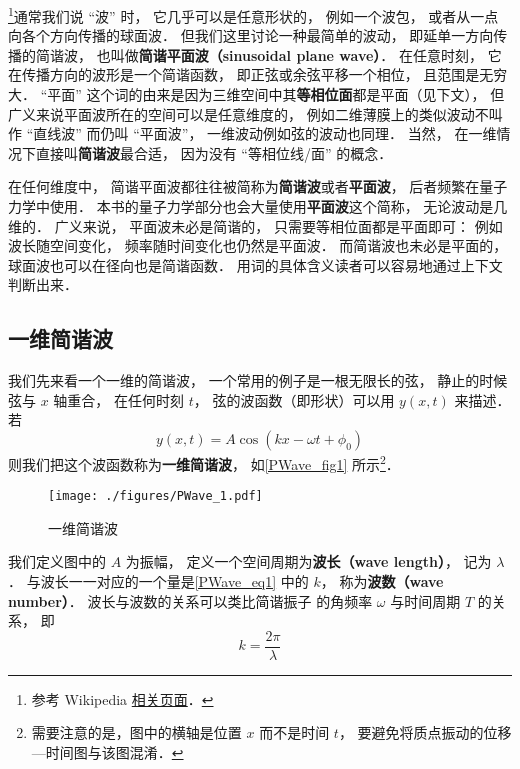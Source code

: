 

\footnote{参考 Wikipedia \href{https://en.wikipedia.org/wiki/Plane_wave#Sinusoidal_plane_wave}{相关页面}．}通常我们说 “波” 时， 它几乎可以是任意形状的， 例如一个波包， 或者从一点向各个方向传播的球面波． 但我们这里讨论一种最简单的波动， 即延单一方向传播的简谐波， 也叫做\textbf{简谐平面波（sinusoidal plane wave）}． 在任意时刻， 它在传播方向的波形是一个简谐函数， 即正弦或余弦平移一个相位， 且范围是无穷大． “平面” 这个词的由来是因为三维空间中其\textbf{等相位面}都是平面（见下文）， 但广义来说平面波所在的空间可以是任意维度的， 例如二维薄膜上的类似波动不叫作 “直线波” 而仍叫 “平面波”， 一维波动例如弦的波动也同理． 当然， 在一维情况下直接叫\textbf{简谐波}最合适， 因为没有 “等相位线/面” 的概念．

在任何维度中， 简谐平面波都往往被简称为\textbf{简谐波}或者\textbf{平面波}， 后者频繁在量子力学中使用． 本书的量子力学部分也会大量使用\textbf{平面波}这个简称， 无论波动是几维的． 广义来说， 平面波未必是简谐的， 只需要等相位面都是平面即可： 例如波长随空间变化， 频率随时间变化也仍然是平面波． 而简谐波也未必是平面的， 球面波也可以在径向也是简谐函数． 用词的具体含义读者可以容易地通过上下文判断出来．

\subsection{一维简谐波}
我们先来看一个一维的简谐波， 一个常用的例子是一根无限长的弦， 静止的时候弦与 $x$ 轴重合， 在任何时刻 $t$， 弦的波函数（即形状）可以用 $y(x, t)$ 来描述． 若
\begin{equation}\label{PWave_eq1}
y(x, t) = A\cos(k x - \omega t + \phi_0)
\end{equation}
则我们把这个波函数称为\textbf{一维简谐波}， 如\autoref{PWave_fig1} 所示\footnote{需要注意的是，图中的横轴是位置 $x$ 而不是时间 $t$， 要避免将质点振动的位移—时间图与该图混淆．}．

\begin{figure}[ht]
\centering
\texttt{[image: ./figures/PWave\_1.pdf]}
\caption{一维简谐波} \label{PWave_fig1}
\end{figure}

我们定义图中的 $A$ 为振幅， 定义一个空间周期为\textbf{波长（wave length）}， 记为 $\lambda$． 与波长一一对应的一个量是\autoref{PWave_eq1} 中的 $k$， 称为\textbf{波数（wave number）}． 波长与波数的关系可以类比简谐振子 的角频率 $\omega$ 与时间周期 $T$ 的关系， 即
\begin{equation}\label{PWave_eq2}
k = \frac{2\pi}{\lambda}
\end{equation}

